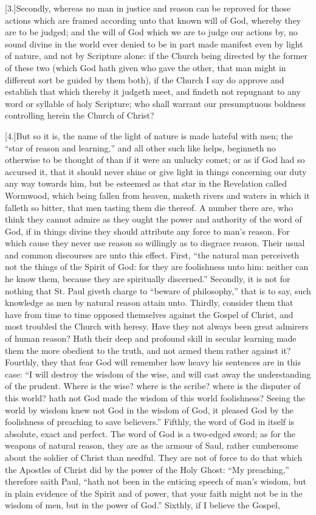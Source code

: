 [3.]Secondly, whereas no man in justice and reason can be reproved for those actions which are framed according unto that known will of God, whereby they are to be judged; and the will of God which we are to judge our actions by, no sound divine in the world ever denied to be in part made manifest even by light of nature, and not by Scripture alone: if the Church being directed by the former of these two (which God hath given who gave the other, that man might in different sort be guided by them both), if the Church I say do approve and establish that which thereby it judgeth meet, and findeth not repugnant to any word or syllable of holy Scripture; who shall warrant our presumptuous boldness controlling herein the Church of Christ?

[4.]But so it is, the name of the light of nature is made hateful with men; the “star of reason and learning,” and all other such like helps, beginneth no otherwise to be thought of than if it were an unlucky comet; or as if God had so accursed it, that it should never shine or give light in things concerning our duty any way towards him, but be esteemed as that star in the Revelation called Wormwood, which being fallen from heaven, maketh rivers and waters in which it falleth so bitter, that men tasting them die thereof. A number there are, who think they cannot admire as they ought the power and authority of the word of God, if in things divine they should attribute any force to man’s reason. For which cause they never use reason so willingly as to disgrace reason. Their usual and common discourses are unto this effect. First, “the natural man perceiveth not the things of the Spirit of God: for they are foolishness unto him: neither can he know them, because they are spiritually discerned.” Secondly, it is not for nothing that St. Paul giveth charge to “beware of philosophy,” that is to say, such knowledge as men by natural reason attain unto. Thirdly, consider them  that have from time to time opposed themselves against the Gospel of Christ, and most troubled the Church with heresy. Have they not always been great admirers of human reason? Hath their deep and profound skill in secular learning made them the more obedient to the truth, and not armed them rather against it? Fourthly, they that fear God will remember how heavy his sentences are in this case: “I will destroy the wisdom of the wise, and will cast away the understanding of the prudent. Where is the wise? where is the scribe? where is the disputer of this world? hath not God made the wisdom of this world foolishness? Seeing the world by wisdom knew not God in the wisdom of God, it pleased God by the foolishness of preaching to save believers.” Fifthly, the word of God in itself is absolute, exact and perfect. The word of God is a two-edged sword; as for the weapons of natural reason, they are as the armour of Saul, rather cumbersome about the soldier of Christ than needful. They are not of force to do that which the Apostles of Christ did by the power of the Holy Ghost: “My preaching,” therefore saith Paul, “hath not been in the enticing speech of man’s wisdom, but in plain evidence of the Spirit and of power, that your faith might not be in the wisdom of men, but in the power of God.” Sixthly, if I believe the Gospel, 